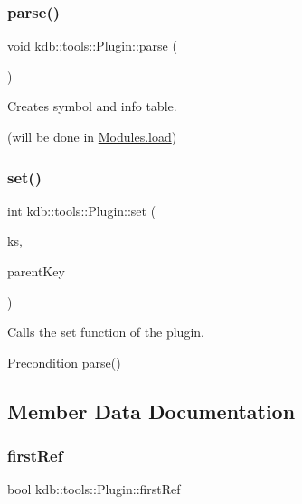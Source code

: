 \subsubsection{\texorpdfstring{parse()}{parse()}}
{\footnotesize\ttfamily void kdb\+::tools\+::\+Plugin\+::parse (\begin{DoxyParamCaption}{ }\end{DoxyParamCaption})}



Creates symbol and info table. 

(will be done in \hyperlink{classkdb_1_1tools_1_1Modules_ae8d8c91745c9f517e6e8a556f1664f69}{Modules.\+load}) \mbox{\label{classkdb_1_1tools_1_1Plugin_abf84d512b48f6fa1b89636217537cde0}} 
\subsubsection{\texorpdfstring{set()}{set()}}
{\footnotesize\ttfamily int kdb\+::tools\+::\+Plugin\+::set (\begin{DoxyParamCaption}\item[{\hyperlink{classkdb_1_1KeySet}{kdb\+::\+Key\+Set} \&}]{ks,  }\item[{\hyperlink{classkdb_1_1Key}{kdb\+::\+Key} \&}]{parent\+Key }\end{DoxyParamCaption})}



Calls the set function of the plugin. 

\begin{DoxyPrecond}{Precondition}
\hyperlink{classkdb_1_1tools_1_1Plugin_adfcba2fbdeb436a1083410df804d5fb0}{parse()} 
\end{DoxyPrecond}


\subsection{Member Data Documentation}
\mbox{\label{classkdb_1_1tools_1_1Plugin_aee8ae2b5708c74d4ccdc1bf9e8794636}} 
\subsubsection{\texorpdfstring{first\+Ref}{firstRef}}
{\footnotesize\ttfamily bool kdb\+::tools\+::\+Plugin\+::first\+Ref}



